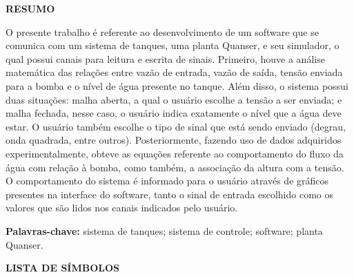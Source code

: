 \documentclass[a4paper,12pt]{article}
\begin{document}
\thispagestyle{empty}

\begin{center}
{\large \textbf{RESUMO}}
\end{center}

\vspace{3cm}

\begin{flushleft}

\hspace{4ex}O presente trabalho é referente ao desenvolvimento de um software que se comunica com um sistema de tanques, uma planta Quanser, e seu simulador, o qual possui canais para leitura e escrita de sinais. Primeiro, houve a análise matemática das relações entre vazão de entrada, vazão de saída, tensão enviada para a bomba e o nível de água presente no tanque. Além disso, o sistema possui duas situações: malha aberta, a qual o usuário escolhe a tensão a ser enviada; e malha fechada, nesse caso, o usuário indica exatamente o nível que a água deve estar. O usuário também escolhe o tipo de sinal que está sendo enviado (degrau, onda quadrada, entre outros). Posteriormente, fazendo uso de dados adquiridos experimentalmente, obteve as equações referente ao comportamento do fluxo da água com relação à bomba, como também, a associação da altura com a tensão. O comportamento do sistema é informado para o usuário através de gráficos presentes na interface do software, tanto o sinal de entrada escolhido como os valores que são lidos nos canais indicados pelo usuário.\\

\end{flushleft}

\vspace{1.5cm}

\textbf{Palavras-chave:} sistema de tanques; sistema de controle; software; planta Quanser.

\newpage


\thispagestyle{empty}

\begin{center}
{\large \textbf{LISTA DE SÍMBOLOS}}
\end{center}

\vspace{3cm}
\end{document}
